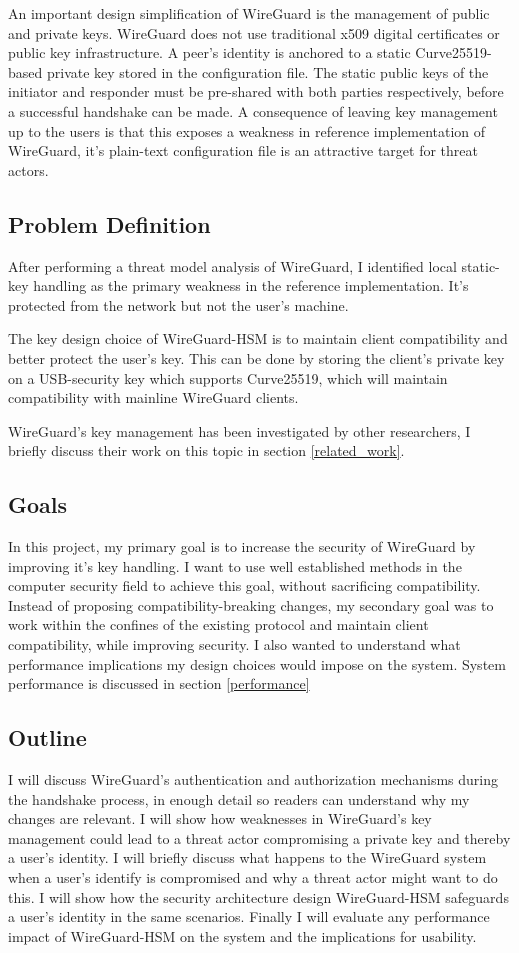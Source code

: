 \documentclass [11pt, proquest] {uwthesis}[2020/02/24]
\begin{document}
An important design simplification of WireGuard is the management of public and private keys. WireGuard does not use traditional x509 digital certificates or public key infrastructure. A peer's identity is anchored to a static Curve25519-based private key stored in the configuration file.
The static public keys of the initiator and responder must be pre-shared with both parties respectively, before a successful handshake can be made. 
A consequence of leaving key management up to the users is that this exposes a weakness in reference implementation of WireGuard, it's plain-text configuration file is an attractive target for threat actors.

\subsection{Problem Definition} \label{problem_definition}
After performing a threat model analysis of WireGuard, I identified local static-key handling as the primary weakness in the reference implementation. It's protected from the network but not the user's machine.

The key design choice of WireGuard-HSM is to maintain client compatibility and better protect the user's key. This can be done by storing the client's private key on a USB-security key which supports Curve25519, which will maintain compatibility with mainline WireGuard clients. 

WireGuard's key management has been investigated by other researchers, I briefly discuss their work on this topic in section \ref{related_work}.

\subsection{Goals}
In this project, my primary goal is to increase the security of WireGuard by improving it's key handling. I want to use well established methods in the computer security field to achieve this goal, without sacrificing compatibility. Instead of proposing compatibility-breaking changes, my secondary goal was to work within the confines of the existing protocol and maintain client compatibility, while improving security. I also wanted to understand what performance implications my design choices would impose on the system. System performance is discussed in section \ref{performance}

\subsection{Outline}
I will discuss WireGuard's authentication and authorization mechanisms during the handshake process, in enough detail so readers can understand why my changes are relevant.
I will show how weaknesses in WireGuard's key management could lead to a threat actor compromising a private key and thereby a user's identity. 
I will briefly discuss what happens to the WireGuard system when a user's identify is compromised and why a threat actor might want to do this.
I will show how the security architecture design WireGuard-HSM safeguards a user's identity in the same scenarios.
Finally I will evaluate any performance impact of WireGuard-HSM on the system and the implications for usability.
\end{document}

